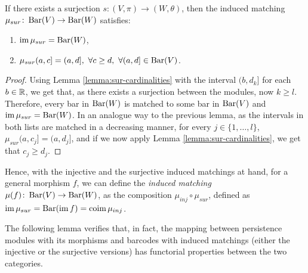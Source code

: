 \begin{lemma} \cite[Exercise 3.1.8]{polterovich} \label{lemma:sur-matching}
    If there exists a surjection $s\colon (V, \pi) \to (W, \theta) $, then the induced matching $ \mu_{sur}\colon \operatorname{Bar}(V) \to \operatorname{Bar} (W) $ satisfies:
    \begin{enumerate}
        \item $\operatorname{im} \mu_{sur} = \operatorname{Bar}(W)$,
        \item $\mu_{sur}(a, c] = (a, d], \ \forall c \geq d, \ \forall (a, d] \in \operatorname{Bar}(V)$.
    \end{enumerate}
\end{lemma}
\begin{proof}
    Using Lemma \ref{lemma:sur-cardinalities} with the interval $(b, d_k]$ for each $ b \in \mathbb R $, we get that, as there exists a surjection between the modules, now $ k \geq l $. Therefore, every bar in $\operatorname{Bar}(W)$ is matched to some bar in $\operatorname{Bar}(V)$ and $\operatorname{im} \mu_{sur} = \operatorname{Bar}(W)$. In an analogue way to the previous lemma, as the intervals in both lists are matched in a decreasing manner, for every $j \in \{1, \dots, l\} $, $\mu_{sur}(a, c_j] = (a, d_j] $, and if we now apply Lemma \ref{lemma:sur-cardinalities}, we get that $ c_j \geq d_j $.
\end{proof}

Hence, with the injective and the surjective induced matchings at hand, for a general morphism $ f $, we can define the {\it induced matching} $ \mu (f) \colon \operatorname{Bar}(V) \to \operatorname{Bar}(W) $, as the composition $ \mu_{inj} \circ \mu_{sur} $, defined as $ \operatorname{im} \mu_{sur} = \operatorname{Bar}(\operatorname{im} f) = \operatorname{coim} \mu_{inj} $.

The following lemma verifies that, in fact, the mapping between persistence modules with its morphisms and barcodes with induced matchings (either the injective or the surjective versions) has functorial properties between the two categories.

